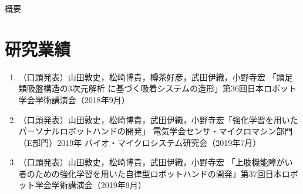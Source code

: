 \documentclass[12pt, twoside,openright,a4paper,papersize,uplatex,dvipdfmx, report]{jsbook}
\begin{document}


\frontmatter



\begin{center}
  {\large \sf 概要}
\end{center}



\tableofcontents
\listoffigures
\listoftables

\mainmatter


\renewcommand{\bibname}{引用文献}
%

%

\label{page:bib}


\chapter*{研究業績}
\begin{enumerate}
	\item （口頭発表）山田敦史，松崎博貴，樽茶好彦，武田伊織，小野寺宏 「頭足類吸盤構造の3次元解析 に基づく吸着システムの造形」第36回日本ロボット学会学術講演会（2018年9月）
	\item （口頭発表）山田敦史，松崎博貴，武田伊織，小野寺宏「強化学習を用いたパーソナルロボットハンドの開発」 電気学会センサ・マイクロマシン部門（E部門）2019年 バイオ・マイクロシステム研究会（2019年7月）
    \item （口頭発表）山田敦史，松崎博貴，武田伊織，小野寺宏 「上肢機能障がい者のための強化学習を用いた自律型ロボットハンドの開発」第37回日本ロボット学会学術講演会（2019年9月）
\end{enumerate}
\end{document}
